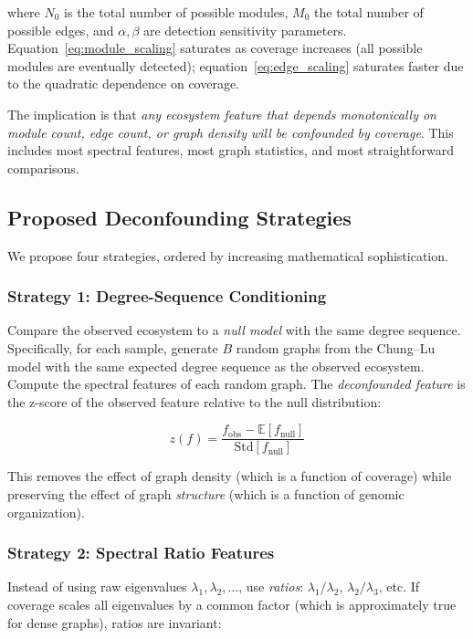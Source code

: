 \documentclass{../yalumba}
\begin{document}
where $N_0$ is the total number of possible modules, $M_0$ the total
number of possible edges, and $\alpha, \beta$ are detection sensitivity
parameters.  Equation~\eqref{eq:module_scaling} saturates as coverage
increases (all possible modules are eventually detected);
equation~\eqref{eq:edge_scaling} saturates faster due to the quadratic
dependence on coverage.

The implication is that \emph{any ecosystem feature that depends
monotonically on module count, edge count, or graph density will be
confounded by coverage}.  This includes most spectral features,
most graph statistics, and most straightforward comparisons.

\subsection{Proposed Deconfounding Strategies}
\label{sec:coverage:strategies}

We propose four strategies, ordered by increasing mathematical
sophistication.

\subsubsection{Strategy 1: Degree-Sequence Conditioning}

Compare the observed ecosystem to a \emph{null model} with the same
degree sequence.  Specifically, for each sample, generate $B$ random
graphs from the Chung--Lu model with the same expected degree sequence
as the observed ecosystem.  Compute the spectral features of each random
graph.  The \emph{deconfounded feature} is the z-score of the observed
feature relative to the null distribution:

\begin{equation}
  z(f) = \frac{f_{\mathrm{obs}} - \mathbb{E}[f_{\mathrm{null}}]}
              {\mathrm{Std}[f_{\mathrm{null}}]}
  \label{eq:zscore}
\end{equation}

This removes the effect of graph density (which is a function of
coverage) while preserving the effect of graph \emph{structure} (which
is a function of genomic organization).

\subsubsection{Strategy 2: Spectral Ratio Features}

Instead of using raw eigenvalues $\lambda_1, \lambda_2, \ldots$, use
\emph{ratios}: $\lambda_1 / \lambda_2$, $\lambda_2 / \lambda_3$, etc.
If coverage scales all eigenvalues by a common factor (which is
approximately true for dense graphs), ratios are invariant:
\end{document}

